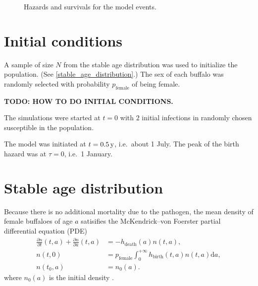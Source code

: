 \documentclass[12pt]{article}
\newcommand{\md}{\mathrm{d}}
\begin{document}
\begin{figure}
  \centering
  \begin{sansmath}
    
  \end{sansmath}
  \caption{Hazards and survivals for the model events.}
  \label{fig:distributions}
\end{figure}


\section{Initial conditions}

A sample of size $N$ from the stable age distribution was used to
initialize the population.  (See \autoref{stable_age_distribution}.)
The sex of each buffalo was randomly selected with probability
$p_{\text{female}}$ of being female.

\textbf{TODO: HOW TO DO INITIAL CONDITIONS.}

\cite{hedger_1972}

The simulations were started at $t = 0$ with $2$ initial infections
in randomly chosen susceptible in the population.

The model was initiated at $t = \unit[0.5]{y}$, i.e.~about 1 July.
The peak of the birth hazard was at $\tau = 0$, i.e.~1 January.


\section{Stable age distribution}
\label{stable_age_distribution}

Because there is no additional mortality due to the pathogen, the mean
density of female buffaloes of age $a$ satisifies the McKendrick--von
Foerster partial differential equation (PDE)
\begin{equation}
  \label{PDE}
  \begin{split}
    \frac{\partial n}{\partial t}(t, a)
    + \frac{\partial n}{\partial a}(t, a)
    &= - h_{\text{death}}(a) n(t, a),
    \\
    n(t, 0) &=
    p_{\text{female}}
    \int_0^{+\infty} h_{\text{birth}}(t, a) n(t, a) \md a,
    \\
    n(t_0, a) &= n_0(a).
  \end{split}
\end{equation}
where $n_0(a)$ is the initial density
\autocite{harris_1963, kot_01}.
\end{document}
